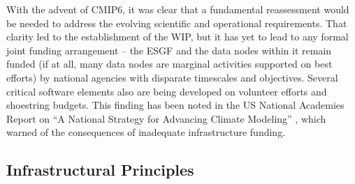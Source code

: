 \documentclass[gmd,manuscript]{copernicus}
\newcommand{\pllabel}[1]{\label{p-#1}\linelabel{l-#1}}
\begin{document}
With the advent of CMIP6, it was clear that
\pllabel{RC2-14}
a fundamental reassessment would be needed to address the evolving
scientific and operational requirements. That clarity led to the
establishment of the WIP, but it has yet to lead to any formal joint
funding arrangement -- the ESGF and the data nodes within it remain
funded (if at all, many data nodes are marginal activities supported
on best efforts) by national agencies with disparate timescales and
objectives. Several critical software elements also are being
developed on volunteer efforts and shoestring budgets. This finding
has been noted in the US National Academies Report on ``A National
Strategy for Advancing Climate Modeling'' \citep{ref:nasem2012}, which
warned of the consequences of inadequate infrastructure funding.

\subsection{Infrastructural Principles}
\label{sec:infra-principles}
\end{document}
